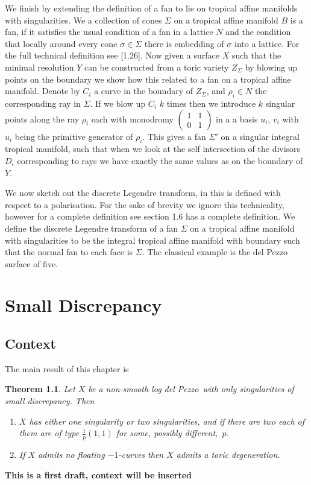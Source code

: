 \documentclass[12pt,a4paper]{book}      %
\newtheorem{thm}{Theorem}[section]
\newcommand{\ldp}{log del Pezzo}
\begin{document}
We finish by extending the definition of a fan to lie on tropical affine manifolds with singularities. We a collection of cones $\Sigma$ on a tropical affine manifold $B$ is a fan, if it satisfies the usual condition of a fan in a lattice $N$ and the condition that locally around every cone $\sigma \in \Sigma$ there is embedding of $\sigma$ into a lattice. For the full technical definition see \cite{GrossBook}[1.26]. Now given a surface $X$ such that the minimal resolution $Y$ can be constructed from a toric variety $Z_\Sigma$ by blowing up points on the boundary we show how this related to a fan on a tropical affine manifold. Denote by $C_i$ a curve in the boundary of $Z_\Sigma$, and $\rho_i \in N$ the corresponding  ray in $\Sigma$. If we blow up $C_i$ $k$ times then we introduce $k$ singular points along the ray $\rho_i$ each with monodromy $\begin{pmatrix} 1 & 1 \\ 0 & 1 \end{pmatrix}$ in a a basis $u_i$, $v_i$ with $u_i$ being the primitive generator of $\rho_i$. This gives a fan $\Sigma'$ on a singular integral tropical manifold, such that when we look at the self intersection of the divisors $D_i$ corresponding to rays we have exactly the same values as on the boundary of $Y$. %

We now sketch out the discrete Legendre transform, in \cite{GrossBook} this is defined with respect to a polarisation. For the sake of brevity we ignore this technicality, however for a complete definition see \cite{GrossBook} section 1.6 has a complete definition. We define the discrete Legendre transform of a fan $\Sigma$ on a tropical affine manifold with singularities to be the integral tropical affine manifold with boundary such that the normal fan to each face is $\Sigma$. The classical example is the del Pezzo surface of five. 

\chapter{Small Discrepancy}

\section{Context}
The main result of this chapter is 
\begin{thm}\label{ThmOnSing}
Let $X$ be a non-smooth \ldp\ with only singularities of small discrepancy. Then 
\begin{enumerate}
\item\label{thm38i}
$X$ has either one singularity or two singularities, and if there are two each of them are of type $\frac{1}p(1,1)$ for some, possibly different,~$p$.
\item\label{thm38ii}
If $X$ admits no floating $-1$-curves then $X$ admits a toric degeneration. %
\end{enumerate}
\end{thm}
\textbf{This is a first draft, context will be inserted}
\end{document}
